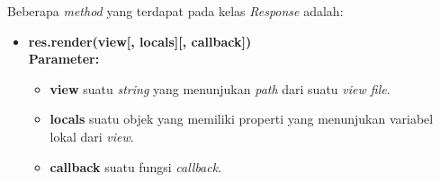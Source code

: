 Beberapa \textit{method} yang terdapat pada kelas \textit{Response} adalah: 

\begin{itemize}
%	
%	
%	
%	
%	
%	
	
	\item \textbf{res.render(view[, locals][, callback])} \\ \textbf{Parameter:}
	\begin{itemize}
		\item \textbf{view} suatu \textit{string} yang menunjukan \textit{path} dari suatu \textit{view file}.
		\item \textbf{locals} suatu objek yang memiliki properti yang menunjukan variabel lokal dari \textit{view}.
		\item \textbf{callback} suatu fungsi \textit{callback}. 
	\end{itemize}
	

\end{itemize}
